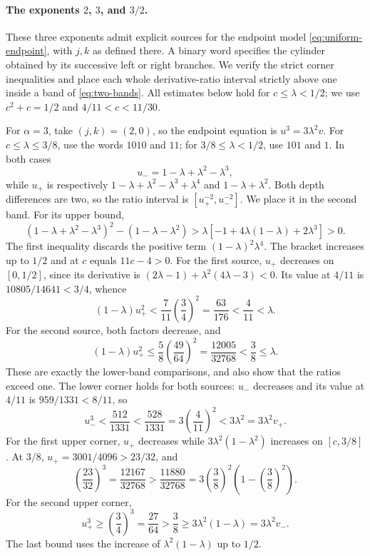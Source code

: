 \paragraph{The exponents $2$, $3$, and $3/2$.}
These three exponents admit explicit sources for the endpoint model
\eqref{eq:uniform-endpoint}, with $j,k$ as defined there.
A binary word specifies the cylinder obtained by its successive left or
right branches. We verify the strict corner inequalities and place each
whole derivative-ratio interval strictly above one inside a band of
\eqref{eq:two-bands}. All estimates below hold for $c\le\lambda<1/2$;
we use $c^2+c=1/2$ and $4/11<c<11/30$.

For $\alpha=3$, take $(j,k)=(2,0)$, so the endpoint equation is
$u^3=3\lambda^2v$.
For $c\le\lambda\le3/8$, use the words $1010$ and $11$;
for $3/8\le\lambda<1/2$, use $101$ and $1$.
In both cases
\[
 u_-=1-\lambda+\lambda^2-\lambda^3,
\]
while $u_+$ is respectively
$1-\lambda+\lambda^2-\lambda^3+\lambda^4$ and $1-\lambda+\lambda^2$.
Both depth differences are two, so the ratio interval is
$[u_+^{-2},u_-^{-2}]$. We place it in the second band.
For its upper bound,
\[
 (1-\lambda+\lambda^2-\lambda^3)^2-(1-\lambda-\lambda^2)
 >\lambda[-1+4\lambda(1-\lambda)+2\lambda^3]>0.
\]
The first inequality discards the positive term $(1-\lambda)^2\lambda^4$.
The bracket increases up to $1/2$ and at $c$ equals $11c-4>0$.
For the first source, $u_+$ decreases on $[0,1/2]$, since its derivative is
$(2\lambda-1)+\lambda^2(4\lambda-3)<0$.
Its value at $4/11$ is $10805/14641<3/4$, whence
\[
 (1-\lambda)u_+^2<\frac7{11}\left(\frac34\right)^2
 =\frac{63}{176}<\frac4{11}<\lambda.
\]
For the second source, both factors decrease, and
\[
 (1-\lambda)u_+^2\le\frac58\left(\frac{49}{64}\right)^2
 =\frac{12005}{32768}<\frac38\le\lambda.
\]
These are exactly the lower-band comparisons, and also show that the ratios
exceed one.
The lower corner holds for both sources: $u_-$ decreases and its value
at $4/11$ is $959/1331<8/11$, so
\[
 u_-^3<\frac{512}{1331}<\frac{528}{1331}
 =3\left(\frac4{11}\right)^2<3\lambda^2=3\lambda^2v_+.
\]
For the first upper corner, $u_+$ decreases while
$3\lambda^2(1-\lambda^2)$ increases on $[c,3/8]$.
At $3/8$, $u_+=3001/4096>23/32$, and
\[
 \left(\frac{23}{32}\right)^3=\frac{12167}{32768}
 >\frac{11880}{32768}
 =3\left(\frac38\right)^2\left(1-\left(\frac38\right)^2\right).
\]
For the second upper corner,
\[
 u_+^3\ge\left(\frac34\right)^3=\frac{27}{64}
 >\frac38\ge3\lambda^2(1-\lambda)=3\lambda^2v_-.
\]
The last bound uses the increase of $\lambda^2(1-\lambda)$ up to $1/2$.

